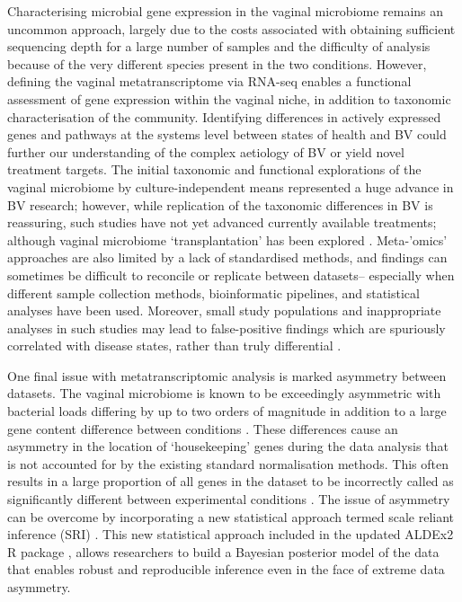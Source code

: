 \documentclass[sn-mathphys,Numbered]{sn-jnl}%
\begin{document}
Characterising microbial gene expression in the vaginal microbiome remains an uncommon approach, largely due to the costs associated with obtaining sufficient sequencing depth for a large number of samples and the difficulty of analysis because of the very different species present in the two conditions. However, defining the vaginal metatranscriptome via RNA-seq enables a functional assessment of gene expression within the vaginal niche, in addition to taxonomic characterisation of the community. Identifying differences in actively expressed genes and pathways at the systems level between states of health and BV could further our understanding of the complex aetiology of BV or yield novel treatment targets. The initial taxonomic \citep{Ravel:2010} and functional \citep{goltsman_metagenomic_2018} explorations of the vaginal microbiome by culture-independent means represented a huge advance in BV research; however, while replication of the taxonomic differences in BV is reassuring, such studies have not yet advanced currently available treatments; although vaginal microbiome `transplantation' has been explored \citep{Lev-Sagie:2019aa}. Meta-'omics' approaches are also limited by a lack of standardised methods, and findings can sometimes be difficult to reconcile or replicate between datasets-- especially when different sample collection methods, bioinformatic pipelines, and statistical analyses have been used. Moreover, small study populations and inappropriate analyses in such studies may lead to false-positive findings which are spuriously correlated with disease states, rather than truly differential \citep{nixon2023scale}. 

One final issue with metatranscriptomic analysis is marked asymmetry between datasets. The vaginal microbiome is known to be exceedingly asymmetric with bacterial loads differing by up to two orders of magnitude \cite{Zozaya:2010} in addition to a large gene content difference between conditions \cite{macklaim:2013, Ma:2020aa, France:2022aa}. These differences cause an asymmetry in the location of `housekeeping' genes during the data analysis that is not accounted for by the existing standard normalisation methods. This often results in a large proportion of all genes in the dataset to be incorrectly called as significantly different between experimental conditions \cite{gloorScale, McGovern2023}. The issue of asymmetry can be overcome by incorporating a new statistical approach termed scale reliant inference (SRI) \cite{nixon2023scale}. This new statistical approach included in the updated ALDEx2 R package \cite{fernandes:2013,gloorScale}, allows researchers to build a Bayesian posterior model of the data that enables robust and reproducible inference even in the face of extreme data asymmetry.
\end{document}
